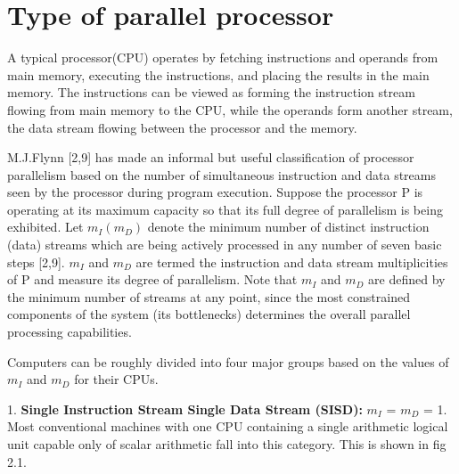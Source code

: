 \section{Type of parallel processor}
A typical processor(CPU) operates by fetching instructions and operands from main memory, executing the instructions, and placing the results in the main
memory. The instructions can be viewed as forming the instruction stream flowing from main memory to the CPU, while the operands form another stream, the
data stream flowing between the processor and the memory. \par
\hspace{1in}M.J.Flynn [2,9] has made an informal but useful classification of processor parallelism based on the number of simultaneous instruction and data
streams seen by the processor during program execution. Suppose the processor P is operating at its maximum capacity so that its full degree of
parallelism is being exhibited. Let $m_{I}(m_{D})$ denote the minimum number of distinct instruction (data) streams which are being actively processed in any
number of seven basic steps [2,9]. $m_{I}$ and $m_{D}$ are termed the instruction and data stream multiplicities of P and measure its degree of parallelism.
Note that $m_{I}$ and $m_{D}$ are defined by the minimum number of streams at any point, since the most constrained components of the system (its
bottlenecks) determines the overall parallel processing capabilities. \par
\hspace{1in}Computers can be roughly divided into four major groups based on the values of $m_{I}$ and $m_{D}$ for their CPUs. 

1. {\bf {Single Instruction Stream Single Data Stream (SISD):}} $m_{I}$ = $m_{D}$ = 1. Most conventional machines with one CPU containing a single
arithmetic logical unit capable only of scalar arithmetic fall into this category. This is shown in fig 2.1.

